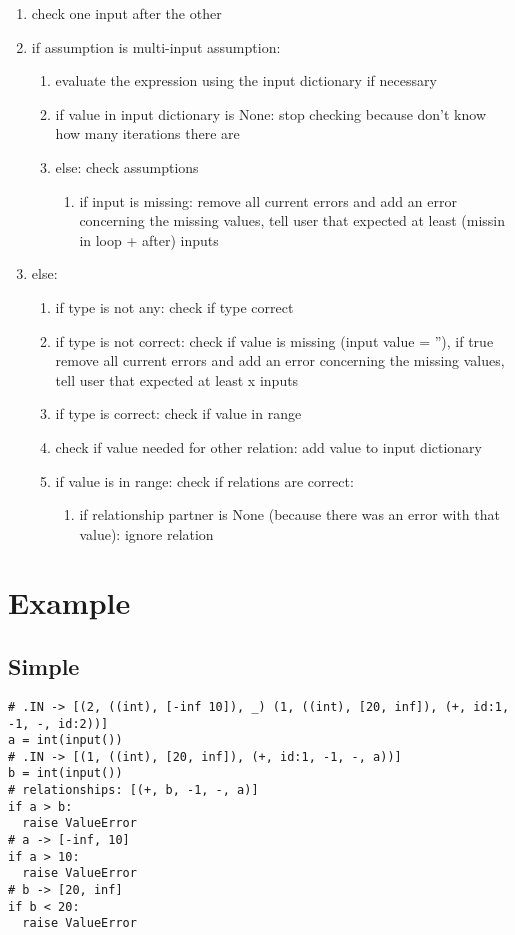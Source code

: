 \documentclass[11pt]{article}
\begin{document}
\begin{enumerate}
    \item check one input after the other
    \item if assumption is multi-input assumption:
    \begin{enumerate}
        \item evaluate the expression using the input dictionary if necessary
        \item if value in input dictionary is None: stop checking because don't know how many iterations there are
        \item else: check assumptions
        \begin{enumerate}
            \item if input is missing: remove all current errors and add an error concerning the missing values, tell user that expected at least (missin in loop + after) inputs
        \end{enumerate}
    \end{enumerate}
    \item else:
    \begin{enumerate}
        \item if type is not any: check if type correct
        \item if type is not correct: check if value is missing (input value = ''), if true remove all current errors and add an error concerning the missing values, tell user that expected at least x inputs
        \item if type is correct: check if value in range
        \item check if value needed for other relation: add value to input dictionary
        \item if value is in range: check if relations are correct:
        \begin{enumerate}
            \item if relationship partner is None (because there was an error with that value): ignore relation
        \end{enumerate}
    \end{enumerate}
\end{enumerate}

\section{Example}

\subsection{Simple}

\begin{lstlisting}
# .IN -> [(2, ((int), [-inf 10]), _) (1, ((int), [20, inf]), (+, id:1, -1, -, id:2))]
a = int(input())
# .IN -> [(1, ((int), [20, inf]), (+, id:1, -1, -, a))]
b = int(input())
# relationships: [(+, b, -1, -, a)]
if a > b:
  raise ValueError
# a -> [-inf, 10]
if a > 10:
  raise ValueError
# b -> [20, inf]
if b < 20:
  raise ValueError
\end{lstlisting}
\end{document}
